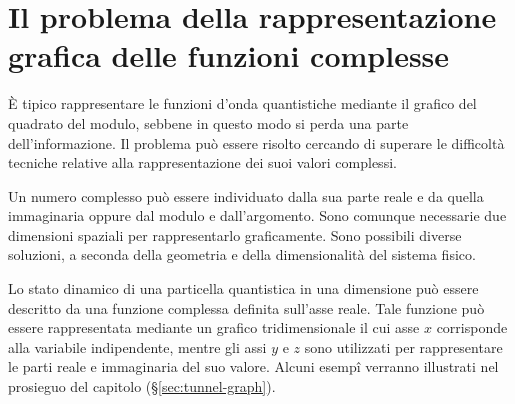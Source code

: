 \section*{} %

\section{Il problema della rappresentazione grafica delle funzioni
complesse} 

\`{E} tipico rappresentare le funzioni d'onda quantistiche mediante
il grafico del quadrato del modulo, sebbene in questo modo si perda
una parte dell'informazione. Il problema può essere risolto
cercando di superare le difficoltà tecniche relative
alla rappresentazione dei suoi valori complessi.

Un numero complesso può essere individuato dalla sua parte reale
e da quella immaginaria oppure dal modulo e dall'argomento. Sono comunque
necessarie due dimensioni spaziali per rappresentarlo graficamente. 
Sono possibili diverse soluzioni, a seconda della geometria e della
dimensionalità del sistema fisico.

Lo
stato dinamico di una particella quantistica in una dimensione
può essere descritto
da una funzione complessa definita sull'asse reale. Tale funzione 
può essere rappresentata mediante un grafico tridimensionale il
cui asse $x$ corrisponde alla variabile indipendente, mentre gli assi
$y$ e $z$ sono utilizzati per rappresentare le parti reale e immaginaria
del suo valore. 
%
Alcuni esemp\^{i} verranno illustrati nel
prosieguo del capitolo (\S \ref{sec:tunnel-graph}).
%
%

